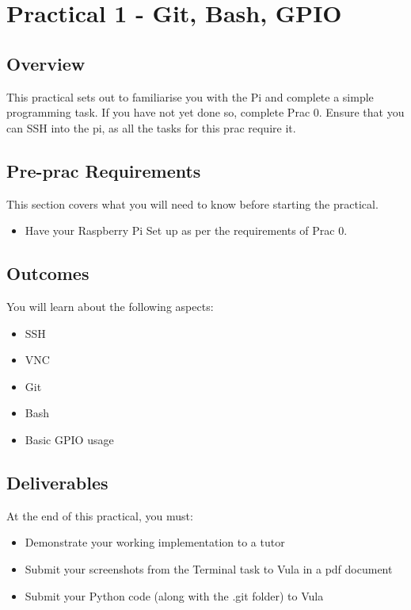 \section{Practical 1 - Git, Bash, GPIO}
\label{sec:Prac1}
\subsection{Overview}
This practical sets out to familiarise you with the Pi and complete a simple programming task. If you have not yet done so, complete Prac 0. Ensure that you can SSH into the pi, as all the tasks for this prac require it.

\subsection{Pre-prac Requirements}
This section covers what you will need to know before starting the practical.
\begin{itemize}
    \item Have your Raspberry Pi Set up as per the requirements of Prac 0.
\end{itemize}

\subsection{Outcomes}
You will learn about the following aspects:
\begin{itemize}
    \item SSH
    \item VNC
    \item Git
    \item Bash
    \item Basic GPIO usage
\end{itemize}

\subsection{Deliverables}
At the end of this practical, you must:
\begin{itemize}
    \item Demonstrate your working implementation to a tutor
    \item Submit your screenshots from the Terminal task to Vula in a pdf document
    \item Submit your Python code (along with the .git folder) to Vula
\end{itemize}

